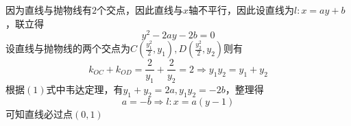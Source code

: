 因为直线与抛物线有$2$个交点，因此直线与$x$轴不平行，因此设直线为$l:x = ay + b$，联立得
\begin{equation}
{y^2} - 2ay - 2b = 0
\end{equation}
设直线与抛物线的两个交点为$C\left( {\frac{{y_1^2}}{2},{y_1}} \right),D\left( {\frac{{y_2^2}}{2},{y_2}} \right)$则有
\begin{equation}
{k_{OC}} + {k_{OD}} = \frac{2}{{{y_1}}} + \frac{2}{{{y_2}}} = 2 \Rightarrow {y_1}{y_2} = {y_1} + {y_2}
\end{equation}
根据$(1)$式中韦达定理，有${y_1} + {y_2} = 2a,{y_1}{y_2} =  - 2b$，整理得
\begin{equation}
a =  - b \Rightarrow l:x = a\left( {y - 1} \right)
\end{equation}
可知直线必过点$\left( {0,1} \right)$